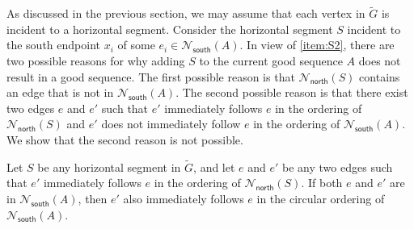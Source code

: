 \documentclass{theoretics}
\newcommand{\Nnorth}{\mathcal{N}_\mathsf{north}}
\newcommand{\Nsouth}{\mathcal{N}_\mathsf{south}}
\begin{document}
As discussed in the previous section, we may assume that each vertex in $\tilde{G}$ is incident to a horizontal segment. Consider the horizontal segment $S$ incident to the south endpoint $x_i$ of some $e_i \in \Nsouth(A)$. In view of \ref{item:S2}, there are two possible reasons for why adding $S$ to the current good sequence $A$ does not result in a good sequence. The first possible reason is that $\Nnorth(S)$ contains an edge that is not in $\Nsouth(A)$. The second possible reason is that there exist two edges $e$ and $e'$ such that $e'$ immediately follows $e$ in the ordering of $\Nnorth(S)$ and $e'$ does not immediately follow $e$ in the ordering of $\Nsouth(A)$. We show that the second reason is not possible. 

\begin{lemma}\label{lem-segment-ascending}
Let $S$ be any horizontal segment in $\tilde{G}$, and let  $e$ and $e'$ be any two edges such that $e'$ immediately follows $e$ in the ordering of $\Nnorth(S)$.
If both $e$ and $e'$ are in $\Nsouth(A)$, then $e'$ also immediately follows $e$ in the circular ordering of $\Nsouth(A)$.
\end{lemma}
\end{document}
